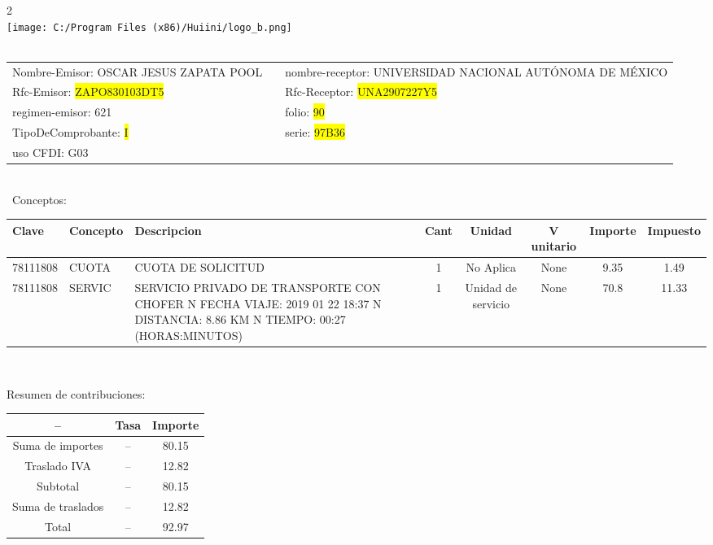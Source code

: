 \documentclass{article}
\begin{document}
\hspace{18cm} 2\\
\texttt{[image: C:/Program Files (x86)/Huiini/logo\_b.png]}
\bigskip\\\
\begin{tabular}{p{11cm}p{1cm}p{8cm}}

Nombre-Emisor: OSCAR JESUS ZAPATA POOL && nombre-receptor: UNIVERSIDAD NACIONAL AUTÓNOMA DE MÉXICO\\

Rfc-Emisor: \colorbox{yellow}{ ZAPO830103DT5 } & & Rfc-Receptor: \colorbox{yellow}{ UNA2907227Y5 }\\

regimen-emisor: 621 & & folio: \colorbox{yellow}{ 90 }\\

TipoDeComprobante: \colorbox{yellow}{ I } & & serie: \colorbox{yellow}{ 97B36 }\\

uso CFDI: G03\\



\end{tabular}
\bigskip\bigskip\bigskip\\\
Conceptos:\\
\begin{tabular}{|p{1.5cm}|p{3.6cm}|p{3.6cm}|c|c|c|c|c|}
\hline
Clave & Concepto & Descripcion & Cant & Unidad & V unitario & Importe & Impuesto \\
\hline

78111808 & CUOTA  & CUOTA DE SOLICITUD & 1 & No Aplica & None & 9.35 &  1.49 \\
\hline

78111808 & SERVIC & SERVICIO PRIVADO DE TRANSPORTE CON CHOFER  N FECHA VIAJE: 2019 01 22 18:37  N DISTANCIA: 8.86 KM  N TIEMPO: 00:27 (HORAS:MINUTOS) & 1 & Unidad de servicio & None & 70.8 &  11.33 \\
\hline

\end{tabular}\\
\bigskip
\begin{center}
Resumen de contribuciones:\\
\bigskip
\begin{tabular}{|c|c|c|}
\hline
 -- & Tasa & Importe\\
\hline

Suma de importes & -- & 80.15 \\
\hline

Traslado IVA & -- & 12.82 \\
\hline

Subtotal  & -- & 80.15 \\
\hline

Suma de traslados & -- & 12.82 \\
\hline

Total  & -- & 92.97 \\
\hline

\end{tabular}
\end{center}
\end{document}
